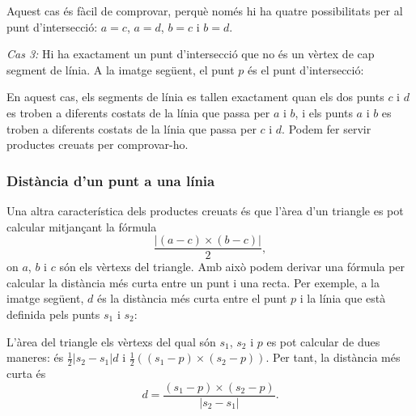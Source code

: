 Aquest cas és fàcil de comprovar, perquè només hi ha quatre
possibilitats per al punt d'intersecció: $a=c$, $a=d$, $b=c$ i $b=d$.

\textit{Cas 3:} Hi ha exactament un punt d'intersecció que no és un
vèrtex de cap segment de línia. A la imatge següent, el punt $p$ és el
punt d'intersecció:
\begin{center}
\end{center}


En aquest cas, els segments de línia es tallen exactament quan els dos
punts $c$ i $d$ es troben a diferents costats de la línia que passa
per $a$ i $b$, i els punts $a$ i $b$ es troben a diferents costats de
la línia que passa per $c$ i $d$. Podem fer servir productes creuats
per comprovar-ho.

\subsubsection{Distància d'un punt a una línia}

Una altra característica dels productes creuats és que l'àrea d'un
triangle es pot calcular mitjançant la fórmula
\[\frac{| (a-c) \times (b-c) |}{2},\]
on $a$, $b$ i $c$ són els vèrtexs del triangle. Amb això podem
derivar una fórmula per calcular la distància més curta entre un punt
i una recta. Per exemple, a la imatge següent, $d$ és la distància més
curta entre el punt $p$ i la línia que està definida pels punts $s_1$
i $s_2$:
\begin{center}
\end{center}


L'àrea del triangle els vèrtexs del qual són $s_1$, $s_2$ i $p$ es pot
calcular de dues maneres: és $\frac{1}{2} |s_2-s_1| d$ i $\frac{1}{2}
((s_1-p) \times (s_2-p))$. Per tant, la distància més curta és
\[ d = \frac{(s_1-p) \times (s_2-p)}{|s_2-s_1|} .\]


